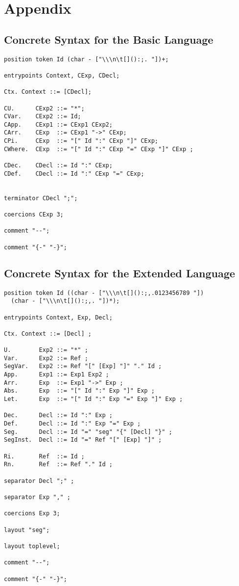 \chapter{Appendix}
\section{Concrete Syntax for the Basic Language} \label{apdix:concrete-syntax-basic}
\begin{verbatim}
position token Id (char - ["\\\n\t[]():;. "])+;

entrypoints Context, CExp, CDecl;

Ctx. Context ::= [CDecl];

CU.      CExp2 ::= "*";
CVar.    CExp2 ::= Id;
CApp.    CExp1 ::= CExp1 CExp2;
CArr.    CExp  ::= CExp1 "->" CExp;
CPi.     CExp  ::= "[" Id ":" CExp "]" CExp;
CWhere.  CExp  ::= "[" Id ":" CExp "=" CExp "]" CExp ;

CDec.    CDecl ::= Id ":" CExp;
CDef.    CDecl ::= Id ":" CExp "=" CExp;


terminator CDecl ";";

coercions CExp 3;

comment "--";

comment "{-" "-}";
\end{verbatim}

\section{Concrete Syntax for the Extended Language} \label{apdix:concrete-syntax-extend}
\begin{verbatim}
position token Id ((char - ["\\\n\t[]():;,.0123456789 "]) 
  (char - ["\\\n\t[]():;,. "])*);

entrypoints Context, Exp, Decl;

Ctx. Context ::= [Decl] ;

U.        Exp2 ::= "*" ;
Var.      Exp2 ::= Ref ;
SegVar.   Exp2 ::= Ref "[" [Exp] "]" "." Id ;
App.      Exp1 ::= Exp1 Exp2 ;
Arr.      Exp  ::= Exp1 "->" Exp ;
Abs.      Exp  ::= "[" Id ":" Exp "]" Exp ;
Let.      Exp  ::= "[" Id ":" Exp "=" Exp "]" Exp ;

Dec.      Decl ::= Id ":" Exp ;
Def.      Decl ::= Id ":" Exp "=" Exp ;
Seg.      Decl ::= Id "=" "seg" "{" [Decl] "}" ;
SegInst.  Decl ::= Id "=" Ref "[" [Exp] "]" ; 

Ri.       Ref  ::= Id ;
Rn.       Ref  ::= Ref "." Id ;

separator Decl ";" ;

separator Exp "," ;

coercions Exp 3;

layout "seg";

layout toplevel;

comment "--";

comment "{-" "-}";
\end{verbatim}

